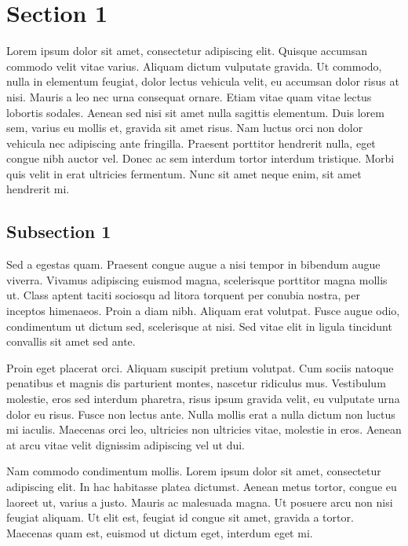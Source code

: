 
\section{Section 1}

Lorem ipsum dolor sit amet, consectetur adipiscing elit. Quisque accumsan commodo velit vitae varius. Aliquam dictum
vulputate gravida. Ut commodo, nulla in elementum feugiat, dolor lectus vehicula velit, eu accumsan dolor risus at nisi.
Mauris a leo nec urna consequat ornare. Etiam vitae quam vitae lectus lobortis sodales. Aenean sed nisi sit amet nulla
sagittis elementum. Duis lorem sem, varius eu mollis et, gravida sit amet risus. Nam luctus orci non dolor vehicula nec
adipiscing ante fringilla. Praesent porttitor hendrerit nulla, eget congue nibh auctor vel. Donec ac sem interdum tortor
interdum tristique. Morbi quis velit in erat ultricies fermentum. Nunc sit amet neque enim, sit amet hendrerit mi.

\subsection{Subsection 1}

Sed a egestas quam. Praesent congue augue a nisi tempor in bibendum augue viverra. Vivamus adipiscing euismod magna,
scelerisque porttitor magna mollis ut. Class aptent taciti sociosqu ad litora torquent per conubia nostra, per inceptos
himenaeos. Proin a diam nibh. Aliquam erat volutpat. Fusce augue odio, condimentum ut dictum sed, scelerisque at nisi.
Sed vitae elit in ligula tincidunt convallis sit amet sed ante.

Proin eget placerat orci. Aliquam suscipit pretium volutpat. Cum sociis natoque penatibus et magnis dis parturient
montes, nascetur ridiculus mus. Vestibulum molestie, eros sed interdum pharetra, risus ipsum gravida velit, eu vulputate
urna dolor eu risus. Fusce non lectus ante. Nulla mollis erat a nulla dictum non luctus mi iaculis. Maecenas orci leo,
ultricies non ultricies vitae, molestie in eros. Aenean at arcu vitae velit dignissim adipiscing vel ut dui.

Nam commodo condimentum mollis. Lorem ipsum dolor sit amet, consectetur adipiscing elit. In hac habitasse platea
dictumst. Aenean metus tortor, congue eu laoreet ut, varius a justo. Mauris ac malesuada magna. Ut posuere arcu non nisi
feugiat aliquam. Ut elit est, feugiat id congue sit amet, gravida a tortor. Maecenas quam est, euismod ut dictum eget,
interdum eget mi.


